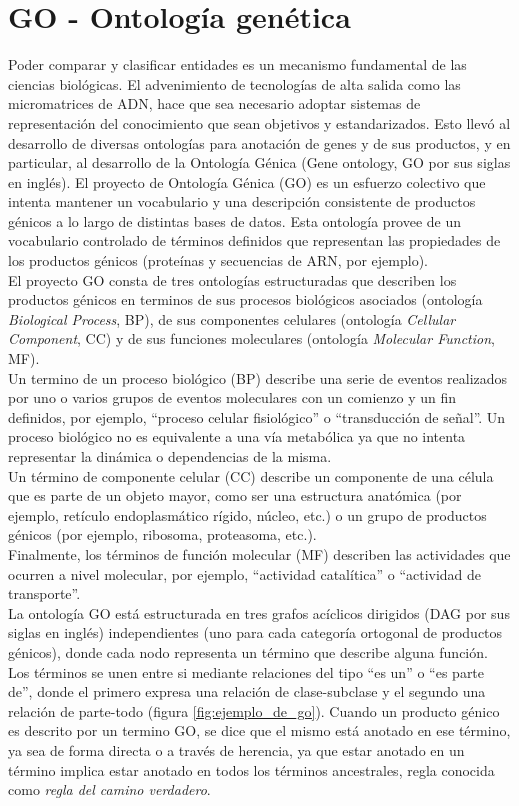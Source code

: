 \section{GO - Ontología genética}
Poder comparar y clasificar entidades es un mecanismo fundamental de las ciencias biológicas. El advenimiento de tecnologías de alta salida como las micromatrices de ADN, hace que sea necesario adoptar sistemas de representación del conocimiento que sean objetivos y estandarizados. Esto llevó al desarrollo de diversas ontologías para anotación de genes y de sus productos, y en particular, al desarrollo de la Ontología Génica (Gene ontology, GO por sus siglas en inglés).
El proyecto de Ontología Génica (GO) es un esfuerzo colectivo que intenta mantener un vocabulario y una descripción consistente de productos génicos a lo largo de distintas bases de datos. Esta ontología provee de un vocabulario controlado de términos definidos que representan las propiedades de los productos génicos (proteínas y secuencias de ARN, por ejemplo).\\
El proyecto GO consta de tres ontologías estructuradas que describen los productos génicos en terminos de sus procesos biológicos asociados (ontología \textit{Biological Process}, BP), de sus componentes celulares (ontología \textit{Cellular Component}, CC) y de sus funciones moleculares (ontología \textit{Molecular Function}, MF).\\
Un termino de un proceso biológico (BP) describe una serie de eventos realizados por uno o varios grupos de eventos moleculares con un comienzo y un fin definidos, por ejemplo, ``proceso celular fisiológico'' o ``transducción de señal''. Un proceso biológico no es equivalente a una vía metabólica ya que no intenta representar la dinámica o dependencias de la misma.\\
Un término de componente celular (CC) describe un componente de una célula que es parte de un objeto mayor, como ser una estructura anatómica (por ejemplo, retículo endoplasmático rígido, núcleo, etc.) o un grupo de productos génicos (por ejemplo, ribosoma, proteasoma, etc.).\\
Finalmente, los términos de función molecular (MF) describen las actividades que ocurren a nivel molecular, por ejemplo, ``actividad catalítica'' o ``actividad de transporte''.\\
La ontología GO está estructurada en tres grafos acíclicos dirigidos (DAG por sus siglas en inglés) independientes (uno para cada categoría ortogonal de productos génicos), donde cada nodo representa un término que describe alguna función. Los términos se unen entre si mediante relaciones del tipo ``es un'' o ``es parte de'', donde el primero expresa una relación de clase-subclase y el segundo una relación de parte-todo (figura \ref{fig:ejemplo_de_go}). Cuando un producto génico es descrito por un termino GO, se dice que el mismo está anotado en ese término, ya sea de forma directa o a través de herencia, ya que estar anotado en un término implica estar anotado en todos los términos ancestrales, regla conocida como \textit{regla del camino verdadero}.\\
